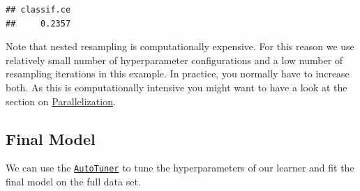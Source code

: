 \documentclass[
]{scrbook}
\newenvironment{Shaded}{\begin{snugshade}}{\end{snugshade}}
\newcommand{\FunctionTok}[1]{\textcolor[rgb]{0.00,0.00,0.00}{#1}}
\newcommand{\NormalTok}[1]{#1}
\newcommand{\SpecialCharTok}[1]{\textcolor[rgb]{0.00,0.00,0.00}{#1}}
\renewenvironment{Shaded} {\begin{snugshade}\small} {\end{snugshade}}
\begin{document}
\begin{verbatim}
## classif.ce 
##     0.2357
\end{verbatim}

Note that nested resampling is computationally expensive.
For this reason we use relatively small number of hyperparameter configurations and a low number of resampling iterations in this example.
In practice, you normally have to increase both.
As this is computationally intensive you might want to have a look at the section on \protect\hyperlink{parallelization}{Parallelization}.

\hypertarget{nested-final-model}{%
\subsection{Final Model}\label{nested-final-model}}

We can use the \href{https://mlr3tuning.mlr-org.com/reference/AutoTuner.html}{\texttt{AutoTuner}} to tune the hyperparameters of our learner and fit the final model on the full data set.

\begin{Shaded}
\end{Shaded}
\end{document}
